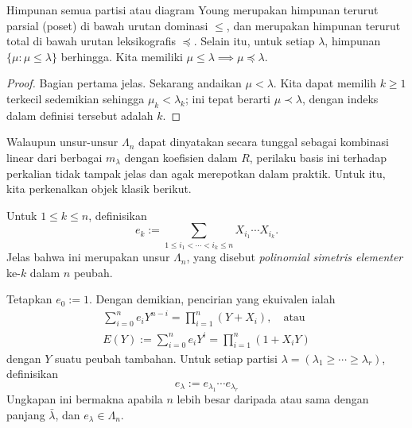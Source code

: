 \begin{proposition}\label{prop:dominance-lex-order}
Himpunan semua partisi atau diagram Young merupakan himpunan terurut parsial (poset) di bawah urutan dominasi $\leq$, dan merupakan himpunan terurut total di bawah urutan leksikografis $\preceq$. Selain itu, untuk setiap $\lambda$, himpunan $\{\mu: \mu \leq \lambda \}$ berhingga. Kita memiliki $\mu \leq \lambda \implies \mu \preceq \lambda$.
\end{proposition}
\begin{proof}
	Bagian pertama jelas. Sekarang andaikan $\mu < \lambda$. Kita dapat memilih $k \geq 1$ terkecil sedemikian sehingga $\mu_k < \lambda_k$; ini tepat berarti $\mu \prec \lambda$, dengan indeks dalam definisi tersebut adalah $k$.
\end{proof}

Walaupun unsur-unsur $\Lambda_n$ dapat dinyatakan secara tunggal sebagai kombinasi linear dari berbagai $m_\lambda$ dengan koefisien dalam $R$, perilaku basis ini terhadap perkalian tidak tampak jelas dan agak merepotkan dalam praktik. Untuk itu, kita perkenalkan objek klasik berikut.
\begin{definition}\label{def:elementary-symm-poly}
	Untuk $1 \leq k \leq n$, definisikan
	\[ e_k := \sum_{1 \leq i_1 < \cdots < i_k \leq n} X_{i_1} \cdots X_{i_k}. \]
	Jelas bahwa ini merupakan unsur $\Lambda_n$, yang disebut \emph{polinomial simetris elementer} ke-$k$ dalam $n$ peubah.
\end{definition}
Tetapkan $e_0 := 1$. Dengan demikian, pencirian yang ekuivalen ialah
\begin{gather*}
	\sum_{i=0}^n e_i Y^{n-i} = \prod_{i=1}^n (Y + X_i), \quad \text{atau} \\
	E(Y) := \sum_{i=0}^n e_i Y^i = \prod_{i=1}^n (1 + X_i Y)
\end{gather*}
dengan $Y$ suatu peubah tambahan. Untuk setiap partisi $\lambda = (\lambda_1 \geq \cdots \geq \lambda_r)$, definisikan
\[ e_\lambda := e_{\lambda_1} \cdots e_{\lambda_r} \]
Ungkapan ini bermakna apabila $n$ lebih besar daripada atau sama dengan panjang $\bar{\lambda}$, dan $e_\lambda \in \Lambda_n$.

